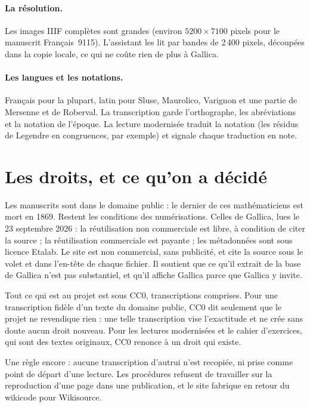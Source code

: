 \paragraph{La résolution.} Les images IIIF complètes sont grandes (environ $5200\times 7100$
pixels pour le manuscrit Français~9115). L'assistant les lit par bandes de 2\,400 pixels,
découpées dans la copie locale, ce qui ne coûte rien de plus à Gallica.

\paragraph{Les langues et les notations.} Français pour la plupart, latin pour Sluse,
Maurolico, Varignon et une partie de Mersenne et de Roberval. La transcription garde
l'orthographe, les abréviations et la notation de l'époque. La lecture modernisée traduit
la notation (les résidus de Legendre en congruences, par exemple) et signale chaque
traduction en note.

\section{Les droits, et ce qu'on a décidé}

Les manuscrits sont dans le domaine public : le dernier de ces mathématiciens est mort en
1869. Restent les conditions des numérisations. Celles de Gallica, lues le 23 septembre
2026 : la réutilisation non commerciale est libre, à condition de citer la source ; la
réutilisation commerciale est payante ; les métadonnées sont sous licence Etalab. Le site
est non commercial, sans publicité, et cite la source sous le volet et dans l'en-tête de
chaque fichier. Il soutient que ce qu'il extrait de la base de Gallica n'est pas
substantiel, et qu'il affiche Gallica parce que Gallica y invite.

Tout ce qui est au projet est sous CC0, transcriptions comprises. Pour une transcription
fidèle d'un texte du domaine public, CC0 dit seulement que le projet ne revendique rien :
une telle transcription vise l'exactitude et ne crée sans doute aucun droit nouveau. Pour
les lectures modernisées et le cahier d'exercices, qui sont des textes originaux, CC0
renonce à un droit qui existe.

Une règle encore : aucune transcription d'autrui n'est recopiée, ni prise comme point de
départ d'une lecture. Les procédures refusent de travailler sur la reproduction d'une page
dans une publication, et le site fabrique en retour du wikicode pour Wikisource.

